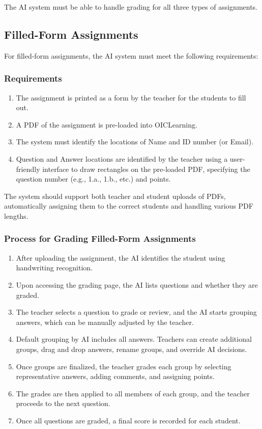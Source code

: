 \documentclass[ms,twoside,print]{nuthesis}
\begin{document}
The AI system must be able to handle grading for all three types of assignments.

\subsection{Filled-Form Assignments}

For filled-form assignments, the AI system must meet the following requirements:

\subsubsection{Requirements}
\begin{enumerate}
    \item The assignment is printed as a form by the teacher for the students to fill out.
    \item A PDF of the assignment is pre-loaded into OICLearning.
    \item The system must identify the locations of Name and ID number (or Email).
    \item Question and Answer locations are identified by the teacher using a user-friendly interface to draw rectangles on the pre-loaded PDF, specifying the question number (e.g., 1.a., 1.b., etc.) and points.
\end{enumerate}

The system should support both teacher and student uploads of PDFs, automatically assigning them to the correct students and handling various PDF lengths.

\subsubsection{Process for Grading Filled-Form Assignments}
\begin{enumerate}
    \item After uploading the assignment, the AI identifies the student using handwriting recognition.
    \item Upon accessing the grading page, the AI lists questions and whether they are graded.
    \item The teacher selects a question to grade or review, and the AI starts grouping answers, which can be manually adjusted by the teacher.
    \item Default grouping by AI includes all answers. Teachers can create additional groups, drag and drop answers, rename groups, and override AI decisions.
    \item Once groups are finalized, the teacher grades each group by selecting representative answers, adding comments, and assigning points.
    \item The grades are then applied to all members of each group, and the teacher proceeds to the next question.
    \item Once all questions are graded, a final score is recorded for each student.
\end{enumerate}
\end{document}
